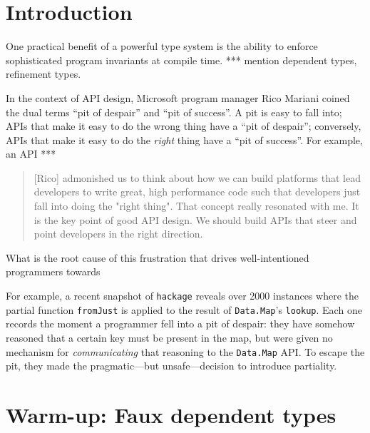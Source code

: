 \documentclass[format=sigplan, review=false, screen=true]{acmart}
\begin{document}
\renewcommand{\shortauthors}{M. Noonan}

%

\section{Introduction}

One practical benefit of a powerful type
system is the ability to enforce sophisticated program
invariants at compile time. *** mention dependent types,
refinement types.

In the context of API design, Microsoft program manager
Rico Mariani coined the dual terms ``pit of despair'' and
``pit of success''. A pit is easy to fall into; APIs that
make it easy to do the wrong thing have a ``pit of despair'';
conversely, APIs that make it easy to do the \emph{right} thing
have a ``pit of success''. For example, an API ***

\begin{quote}
  [Rico] admonished us to think about how we can build platforms that lead developers to write great, high performance code such that developers just fall into doing the "right thing". That concept really resonated with me. It is the key point of good API design. We should build APIs that steer and point developers in the right direction.
\end{quote}

What is the root cause of this frustration that drives
well-intentioned programmers towards 


For example, a recent snapshot of \texttt{hackage}
reveals over 2000 instances where the partial function
\texttt{fromJust} is applied to the
result of \texttt{Data.Map}'s \texttt{lookup}. Each one
records the moment a programmer fell into a pit of despair:
they have somehow reasoned that a certain key must be
present in the map, but were given no mechanism for
\emph{communicating} that reasoning to the
\texttt{Data.Map} API. To escape the pit, they made the
pragmatic---but unsafe---decision to introduce partiality.

\section{Warm-up: Faux dependent types}
\end{document}
